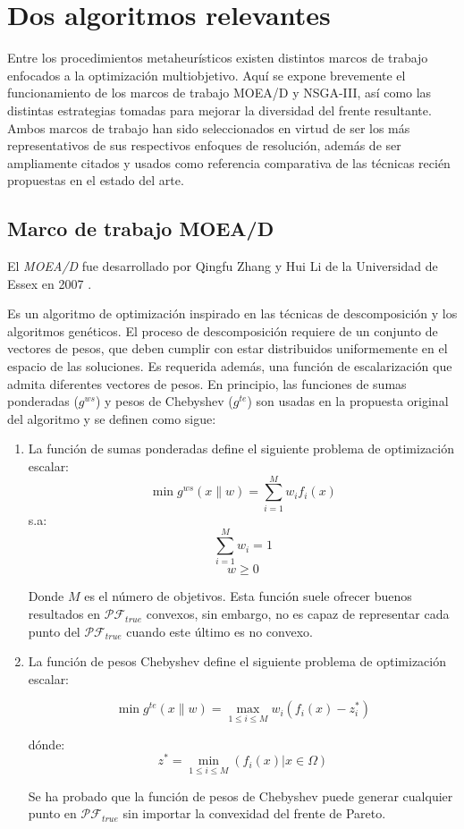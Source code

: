 \section{Dos algoritmos relevantes}

Entre los procedimientos metaheurísticos existen distintos marcos de trabajo enfocados a la optimización multiobjetivo.
Aquí se expone brevemente el funcionamiento de los marcos de trabajo MOEA/D y NSGA-III, así como las distintas estrategias tomadas para mejorar la diversidad del frente resultante.
Ambos marcos de trabajo han sido seleccionados en virtud de ser los más representativos de sus respectivos enfoques de resolución, además de ser ampliamente citados y usados como 
referencia comparativa de las técnicas recién propuestas en el estado del arte.

\subsection{Marco de trabajo MOEA/D}
El \emph{MOEA/D} fue desarrollado por Qingfu Zhang y Hui Li de la Universidad de Essex en 2007 \cite{4358754}.

Es un algoritmo de optimización inspirado en las técnicas de descomposición y los algoritmos genéticos. El proceso de descomposición requiere de un conjunto de vectores de pesos,
que deben cumplir con estar distribuidos uniformemente en el espacio de las soluciones. Es requerida además, una función de escalarización que admita diferentes vectores de pesos. En principio,
las funciones de sumas ponderadas  ($g^{ws}$) y pesos de Chebyshev ($g^{te}$) son usadas en la propuesta original del algoritmo y se definen como sigue:

\begin{enumerate}
\item La función de sumas ponderadas define el siguiente problema de optimización escalar:
$$\min g^{ws}(x\|w) = \sum^M_{i=1} w_if_i(x) $$
s.a:
$$ \sum^M_{i=1} w_i = 1$$
$$w \geq 0$$

Donde $M$ es el número de objetivos. Esta función suele ofrecer buenos resultados en $\mathcal{PF}_{true}$ convexos, sin embargo, no es capaz de representar cada punto del $\mathcal{PF}_{true}$ cuando este último es no convexo.

\item La función de pesos Chebyshev define el siguiente problema de optimización escalar:

$$\min g^{te}(x\|w) = \max_{1\leq i \leq M} w_i(f_i(x) -z_i^{*})$$

dónde:
$$z^{*}= \min_{1\leq i \leq M} (f_i(x) | x \in \Omega) $$

Se ha probado que la función de pesos de Chebyshev puede generar cualquier punto en $\mathcal{PF}_{true}$ sin importar la convexidad del frente de Pareto.
\end{enumerate}

